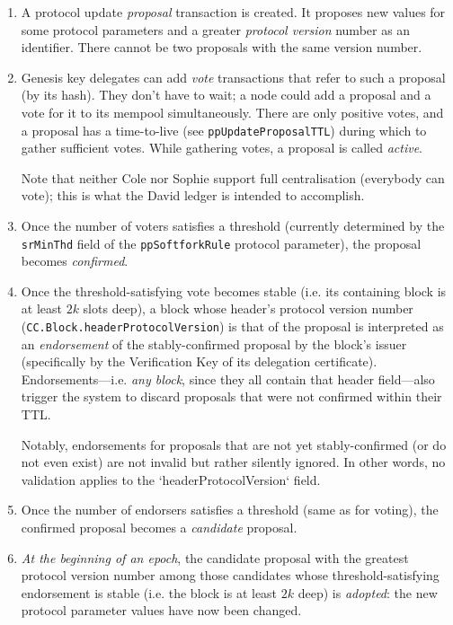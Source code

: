 \begin{enumerate}

\item
A protocol update \emph{proposal} transaction is created. It proposes new values
for some protocol parameters and a greater \emph{protocol version} number as an
identifier. There cannot be two proposals with the same version number.

\item
Genesis key delegates can add \emph{vote} transactions that refer to such a
proposal (by its hash). They don't have to wait; a node could add a proposal and
a vote for it to its mempool simultaneously. There are only positive votes, and
a proposal has a time-to-live (see \lstinline!ppUpdateProposalTTL!) during which
to gather sufficient votes. While gathering votes, a proposal is called
\emph{active}.

Note that neither Cole nor Sophie support full centralisation (everybody can
vote); this is what the David ledger is intended to accomplish.

\item
Once the number of voters satisfies a threshold (currently determined by the
\lstinline!srMinThd! field of the \lstinline!ppSoftforkRule! protocol
parameter), the proposal becomes \emph{confirmed}.

\item
Once the threshold-satisfying vote becomes stable (i.e. its containing block is at
least $2k$ slots deep), a block whose header's protocol version number
(\lstinline!CC.Block.headerProtocolVersion!) is that of the proposal is
interpreted as an \emph{endorsement} of the stably-confirmed proposal by the
block's issuer (specifically by the Verification Key of its delegation
certificate). Endorsements---i.e. \emph{any block}, since they all contain that
header field---also trigger the system to discard proposals that were not
confirmed within their TTL.

Notably, endorsements for proposals that are not yet stably-confirmed (or do not
even exist) are not invalid but rather silently ignored. In other words, no
validation applies to the `headerProtocolVersion` field.

\item
Once the number of endorsers satisfies a threshold (same as for voting), the
confirmed proposal becomes a \emph{candidate} proposal.

\item
\emph{At the beginning of an epoch}, the candidate proposal with the greatest
protocol version number among those candidates whose threshold-satisfying
endorsement is stable (i.e. the block is at least $2k$ deep) is \emph{adopted}:
the new protocol parameter values have now been changed.


\end{enumerate}
